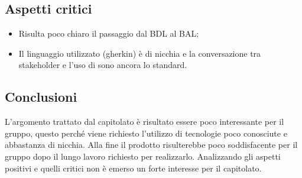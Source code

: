 \subsection{Aspetti critici}
\begin{itemize}
\item Risulta poco chiaro il passaggio dal BDL al BAL;
\item Il linguaggio utilizzato (gherkin) è di nicchia e la conversazione tra stakeholder e l'uso di  sono ancora lo standard.
\end{itemize}

\subsection{Conclusioni}
L'argomento trattato dal capitolato è risultato essere poco interessante per il gruppo, questo perché viene richiesto l'utilizzo di tecnologie poco conosciute e abbastanza di nicchia. Alla fine il prodotto risulterebbe poco soddisfacente per il gruppo dopo il lungo lavoro richiesto per realizzarlo.
Analizzando gli aspetti positivi e quelli critici non è emerso un forte interesse per il capitolato.